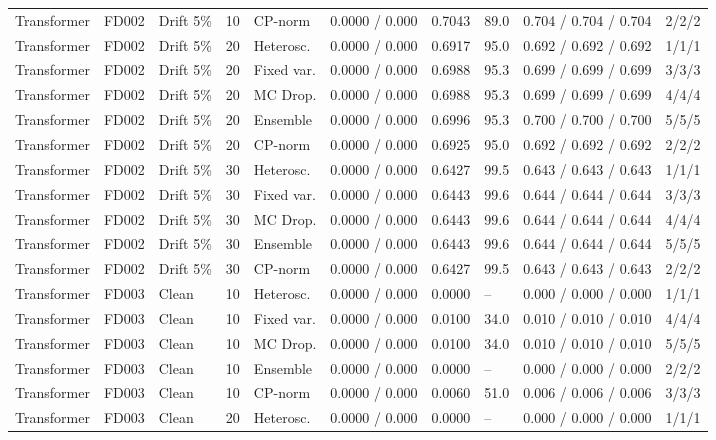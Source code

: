 \documentclass[10pt,a4paper]{article}
\begin{document}
\begin{landscape}
\begin{center}
\begin{longtable}{lllllcclll}
Transformer & FD002 & Drift 5\% & 10 & CP-norm & 0.0000 / 0.000 & 0.7043 & 89.0 & 0.704 / 0.704 / 0.704 & 2/2/2 \\
Transformer & FD002 & Drift 5\% & 20 & Heterosc. & 0.0000 / 0.000 & 0.6917 & 95.0 & 0.692 / 0.692 / 0.692 & 1/1/1 \\
Transformer & FD002 & Drift 5\% & 20 & Fixed var. & 0.0000 / 0.000 & 0.6988 & 95.3 & 0.699 / 0.699 / 0.699 & 3/3/3 \\
Transformer & FD002 & Drift 5\% & 20 & MC Drop. & 0.0000 / 0.000 & 0.6988 & 95.3 & 0.699 / 0.699 / 0.699 & 4/4/4 \\
Transformer & FD002 & Drift 5\% & 20 & Ensemble & 0.0000 / 0.000 & 0.6996 & 95.3 & 0.700 / 0.700 / 0.700 & 5/5/5 \\
Transformer & FD002 & Drift 5\% & 20 & CP-norm & 0.0000 / 0.000 & 0.6925 & 95.0 & 0.692 / 0.692 / 0.692 & 2/2/2 \\
Transformer & FD002 & Drift 5\% & 30 & Heterosc. & 0.0000 / 0.000 & 0.6427 & 99.5 & 0.643 / 0.643 / 0.643 & 1/1/1 \\
Transformer & FD002 & Drift 5\% & 30 & Fixed var. & 0.0000 / 0.000 & 0.6443 & 99.6 & 0.644 / 0.644 / 0.644 & 3/3/3 \\
Transformer & FD002 & Drift 5\% & 30 & MC Drop. & 0.0000 / 0.000 & 0.6443 & 99.6 & 0.644 / 0.644 / 0.644 & 4/4/4 \\
Transformer & FD002 & Drift 5\% & 30 & Ensemble & 0.0000 / 0.000 & 0.6443 & 99.6 & 0.644 / 0.644 / 0.644 & 5/5/5 \\
Transformer & FD002 & Drift 5\% & 30 & CP-norm & 0.0000 / 0.000 & 0.6427 & 99.5 & 0.643 / 0.643 / 0.643 & 2/2/2 \\
Transformer & FD003 & Clean & 10 & Heterosc. & 0.0000 / 0.000 & 0.0000 & -- & 0.000 / 0.000 / 0.000 & 1/1/1 \\
Transformer & FD003 & Clean & 10 & Fixed var. & 0.0000 / 0.000 & 0.0100 & 34.0 & 0.010 / 0.010 / 0.010 & 4/4/4 \\
Transformer & FD003 & Clean & 10 & MC Drop. & 0.0000 / 0.000 & 0.0100 & 34.0 & 0.010 / 0.010 / 0.010 & 5/5/5 \\
Transformer & FD003 & Clean & 10 & Ensemble & 0.0000 / 0.000 & 0.0000 & -- & 0.000 / 0.000 / 0.000 & 2/2/2 \\
Transformer & FD003 & Clean & 10 & CP-norm & 0.0000 / 0.000 & 0.0060 & 51.0 & 0.006 / 0.006 / 0.006 & 3/3/3 \\
Transformer & FD003 & Clean & 20 & Heterosc. & 0.0000 / 0.000 & 0.0000 & -- & 0.000 / 0.000 / 0.000 & 1/1/1 \\

\end{longtable}
\end{center}
\end{landscape}
\end{document}
